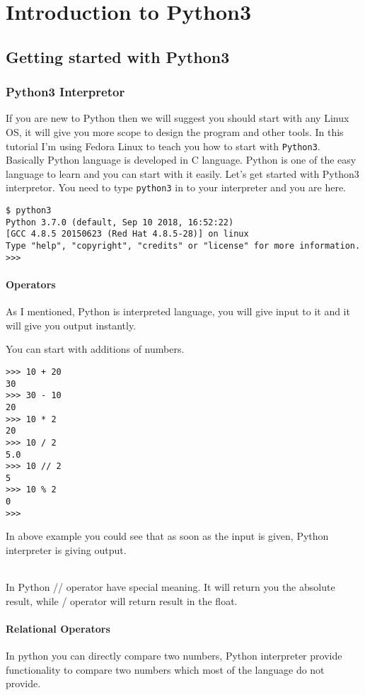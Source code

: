 \documentclass[letterpaper,12pt]{book}
\begin{document}
\tableofcontents
\part{Introduction to Python3}

\chapter{Getting started with Python3}

\section{Python3 Interpretor}
If you are new to Python then we will suggest you should start with any Linux OS, it will give you more scope to design the program and other tools. In this tutorial I'm using Fedora Linux to teach you how to start with \texttt{Python3}. Basically Python language is developed in C language. Python is one of the easy language to learn and you can start with it easily.
Let's get started with Python3 interpretor. You need to type \texttt{python3} in to your interpreter and you are here.

\begin{verbatim}
$ python3
Python 3.7.0 (default, Sep 10 2018, 16:52:22) 
[GCC 4.8.5 20150623 (Red Hat 4.8.5-28)] on linux
Type "help", "copyright", "credits" or "license" for more information.
>>>
\end{verbatim}
\subsection{Operators}
As I mentioned, Python is interpreted language, you will give input to it and it will give you output instantly.

You can start with additions of numbers.
\begin{verbatim}
>>> 10 + 20
30
>>> 30 - 10
20
>>> 10 * 2
20
>>> 10 / 2
5.0
>>> 10 // 2
5
>>> 10 % 2
0
>>> 
\end{verbatim}
In above example you could see that as soon as the input is given, Python interpreter is giving output.

\paragraph{}
In Python // operator have special meaning. It will return you the absolute result, while / operator will return result in the float.

\subsection{Relational Operators}
In python you can directly compare two numbers, Python interpreter provide functionality to compare two numbers which most of the language do not provide.
\end{document}
